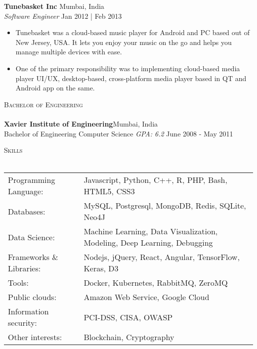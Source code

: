 \documentclass[a4paper]{article}
\newcommand{\lineunder} {
    \vspace*{-8pt} \\
    \hspace*{-18pt} \hrulefill \\
}
\newcommand{\header} [1] {
    {\hspace*{-18pt}\vspace*{6pt} \textsc{#1}}
    \vspace*{-6pt} \lineunder
}
\begin{document}
\textbf{Tunebasket Inc} \hfill Mumbai, India\\
\textit{Software Engineer} \hfill Jan 2012 | Feb 2013\\
\vspace{-1mm}
\begin{itemize} \itemsep 1pt
	\item Tunebasket was a cloud-based music player for Android and PC based out of New Jersey, USA. It lets you enjoy your music on the go and helps you manage multiple devices with ease.
	\item One of the primary responsibility was to implementing cloud-based media player UI/UX, desktop-based, cross-platform media player based in QT and Android app on the same.
\end{itemize}

\header{Bachelor of Engineering}
\textbf{Xavier Institute of Engineering}\hfill Mumbai, India\\
Bachelor of Engineering Computer Science \textit{GPA: 6.2} \hfill June 2008 - May 2011\\
\vspace{2mm}

\header{Skills}
\begin{tabular}{ l l }
	Programming Language:    & Javascript, Python, C++, R, PHP, Bash, HTML5, CSS3                       \\
	Databases:               & MySQL, Postgresql, MongoDB, Redis, SQLite, Neo4J                         \\
	Data Science:            & Machine Learning, Data Visualization, Modeling, Deep Learning, Debugging \\
	Frameworks \& Libraries: & Nodejs, jQuery, React, Angular, TensorFlow, Keras, D3                    \\
	Tools:                   & Docker, Kubernetes, RabbitMQ, ZeroMQ                                     \\
	Public clouds:           & Amazon Web Service, Google Cloud                                         \\
	Information security:    & PCI-DSS, CISA, OWASP                                                     \\
	Other interests:         & Blockchain, Cryptography                                                 \\
\end{tabular}
\vspace{2mm}



\ 
\end{document}
